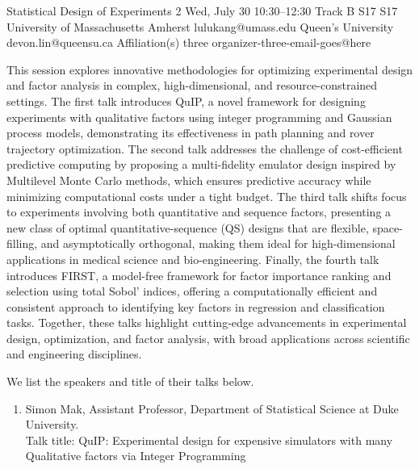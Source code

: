 \begin{talk}
  {Statistical Design of Experiments}%
  {2}%
  {}%
  {}%
  {}%
  {}%
  {Wed, July 30 10:30–12:30 Track B}%
  {S17}%
  {S17}%
  {%
    {University of Massachusetts Amherst}%
    {lulukang@umass.edu}}%
  {%
	{Queen's University}%
	{devon.lin@queensu.ca}}%
  {%
	{Affiliation(s) three}%
	{organizer-three-email-goes@here}}%


\medskip

This session explores innovative methodologies for optimizing experimental design and factor analysis in complex, high-dimensional, and resource-constrained settings. The first talk introduces QuIP, a novel framework for designing experiments with qualitative factors using integer programming and Gaussian process models, demonstrating its effectiveness in path planning and rover trajectory optimization. The second talk addresses the challenge of cost-efficient predictive computing by proposing a multi-fidelity emulator design inspired by Multilevel Monte Carlo methods, which ensures predictive accuracy while minimizing computational costs under a tight budget. The third talk shifts focus to experiments involving both quantitative and sequence factors, presenting a new class of optimal quantitative-sequence (QS) designs that are flexible, space-filling, and asymptotically orthogonal, making them ideal for high-dimensional applications in medical science and bio-engineering. Finally, the fourth talk introduces FIRST, a model-free framework for factor importance ranking and selection using total Sobol' indices, offering a computationally efficient and consistent approach to identifying key factors in regression and classification tasks. Together, these talks highlight cutting-edge advancements in experimental design, optimization, and factor analysis, with broad applications across scientific and engineering disciplines.

We list the speakers and title of their talks below. 

\begin{enumerate}
\item Simon Mak, Assistant Professor, Department of Statistical Science at Duke University. \\
Talk title: QuIP: Experimental design for expensive simulators with many Qualitative factors via Integer Programming


\end{enumerate}
\end{talk}
